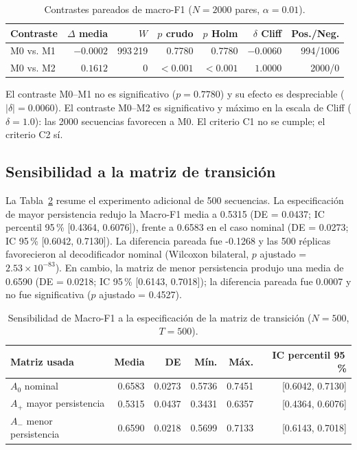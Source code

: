 \documentclass[11pt,letterpaper]{article}
\begin{document}
\begin{table}[H]
\centering
\caption{Contrastes pareados de macro-F1 (\(N=2000\) pares, \(\alpha=0.01\)).}
\label{tab:contrastes}
\small
\begin{tabular}{@{}lrrrrrr@{}}
\toprule
Contraste & \(\Delta\) media & \(W\) & \(p\) crudo & \(p\) Holm & \(\delta\) Cliff & Pos./Neg.\\
\midrule
M0 vs. M1 & \(-0.0002\) & 993\,219 & 0.7780 & 0.7780 & \(-0.0060\) & 994/1006\\
M0 vs. M2 & \(0.1612\) & 0 & \(<0.001\) & \(<0.001\) & \(1.0000\) & 2000/0\\
\bottomrule
\end{tabular}
\end{table}

El contraste M0--M1 no es significativo (\(p=0.7780\)) y su efecto es despreciable (\(|\delta|=0.0060\)). El contraste M0--M2 es significativo y máximo en la escala de Cliff (\(\delta=1.0\)): las 2000 secuencias favorecen a M0. El criterio C1 no se cumple; el criterio C2 sí.

\subsection{Sensibilidad a la matriz de transición}

La Tabla~\ref{tab:sensibilidadA} resume el experimento adicional de 500 secuencias. La especificación de mayor persistencia redujo la Macro-F1 media a 0.5315 (DE = 0.0437; IC percentil 95\,\% [0.4364, 0.6076]), frente a 0.6583 en el caso nominal (DE = 0.0273; IC 95\,\% [0.6042, 0.7130]). La diferencia pareada fue -0.1268 y las 500 réplicas favorecieron al decodificador nominal (Wilcoxon bilateral, $p$ ajustado = $2.53\times10^{-83}$). En cambio, la matriz de menor persistencia produjo una media de 0.6590 (DE = 0.0218; IC 95\,\% [0.6143, 0.7018]); la diferencia pareada fue 0.0007 y no fue significativa ($p$ ajustado = 0.4527).

\begin{table}[H]
\centering
\caption{Sensibilidad de Macro-F1 a la especificación de la matriz de transición ($N=500$, $T=500$).}
\label{tab:sensibilidadA}
\small
\begin{tabular}{@{}lrrrrr@{}}
\toprule
Matriz usada & Media & DE & Mín. & Máx. & IC percentil 95\,\%\\
\midrule
$A_0$ nominal & 0.6583 & 0.0273 & 0.5736 & 0.7451 & [0.6042, 0.7130]\\
$A_{+}$ mayor persistencia & 0.5315 & 0.0437 & 0.3431 & 0.6357 & [0.4364, 0.6076]\\
$A_{-}$ menor persistencia & 0.6590 & 0.0218 & 0.5699 & 0.7133 & [0.6143, 0.7018]\\
\bottomrule
\end{tabular}
\end{table}
\end{document}
